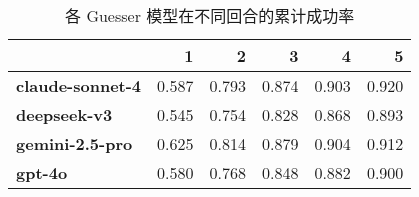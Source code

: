 \begin{table}
\caption{各 Guesser 模型在不同回合的累计成功率}
\label{tab:cum_success_guesser}
\begin{tabular}{lrrrrr}
\toprule
 & 1 & 2 & 3 & 4 & 5 \\
\midrule
\textbf{claude-sonnet-4} & 0.587 & 0.793 & 0.874 & 0.903 & 0.920 \\
\textbf{deepseek-v3} & 0.545 & 0.754 & 0.828 & 0.868 & 0.893 \\
\textbf{gemini-2.5-pro} & 0.625 & 0.814 & 0.879 & 0.904 & 0.912 \\
\textbf{gpt-4o} & 0.580 & 0.768 & 0.848 & 0.882 & 0.900 \\
\bottomrule
\end{tabular}
\end{table}
